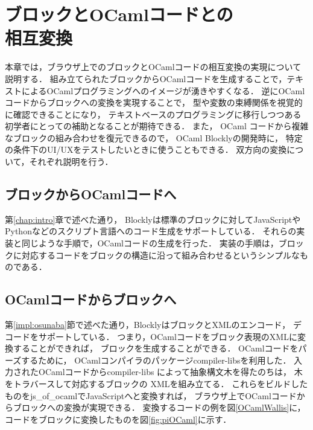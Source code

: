 \chapter[ブロックとOCamlコードとの相互変換]{ブロックとOCamlコードとの\\相互変換}\label{chap:converter}


本章では，ブラウザ上でのブロックとOCamlコードの相互変換の実現について説明する．
組み立てられたブロックからOCamlコードを生成することで，テキストによるOCamlプログラミングへのイメージが湧きやすくなる．
逆にOCamlコードからブロックへの変換を実現することで，
型や変数の束縛関係を視覚的に確認できることになり，
テキストベースのプログラミングに移行しつつある初学者にとっての補助となることが期待できる．
また， OCaml コードから複雑なブロックの組み合わせを復元できるので，
OCaml Blocklyの開発時に，
特定の条件下のUI/UXをテストしたいときに使うこともできる．
双方向の変換について，それぞれ説明を行う．

\section {ブロックからOCamlコードへ}
第\ref{chap:intro}章で述べた通り，
Blocklyは標準のブロックに対してJavaScriptやPythonなどのスクリプト言語へのコード生成をサポートしている．
それらの実装と同じような手順で，OCamlコードの生成を行った．
実装の手順は，ブロックに対応するコードをブロックの構造に沿って組み合わせるというシンプルなものである．

\section {OCamlコードからブロックへ}
第\ref{impl:osunaba}節で述べた通り，BlocklyはブロックとXMLのエンコード，
デコードをサポートしている．
つまり，OCamlコードをブロック表現のXMLに変換することができれば，
ブロックを生成することができる．
OCamlコードをパーズするために，
OCamlコンパイラのパッケージcompiler-libsを利用した．
入力されたOCamlコードからcompiler-libs によって抽象構文木を得たのちは，
木をトラバースして対応するブロックの XMLを組み立てる．
これらをビルドしたものをjs\_of\_ocamlでJavaScriptへと変換すれば，
ブラウザ上でOCamlコードからブロックへの変換が実現できる．
変換するコードの例を図\ref{OCamlWallis}に，
コードをブロックに変換したものを図\ref{fig:piOCaml}に示す．

